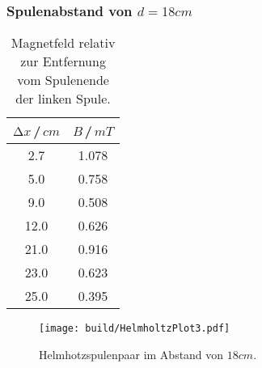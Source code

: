     \subsubsection{Spulenabstand von $d=18\unit{cm}$}

    \begin{table}[H]
        \centering
        \begin{tabular}{c c}
            \toprule
            $\increment x$\,/\,$\unit{cm}$& $B$\,/\,$\unit{mT}$\\
            \midrule
            2.7   &  1.078\\
            5.0   &  0.758\\
            9.0   &  0.508\\
            12.0  &  0.626\\
            21.0  &  0.916\\
            23.0  &  0.623\\
            25.0  &  0.395\\
            \bottomrule
        \end{tabular}
        \caption{Magnetfeld relativ zur Entfernung vom Spulenende der linken Spule.}
        \label{tab:HelmTab18}
    \end{table}
    \begin{figure}[H]
        \centering
        \texttt{[image: build/HelmholtzPlot3.pdf]}
        \caption{Helmhotzspulenpaar im Abstand von $18\unit{cm}$.}
        \label{fig:HelmholtzPlot3}
    \end{figure}

    \label{sec:AuswHelm}
